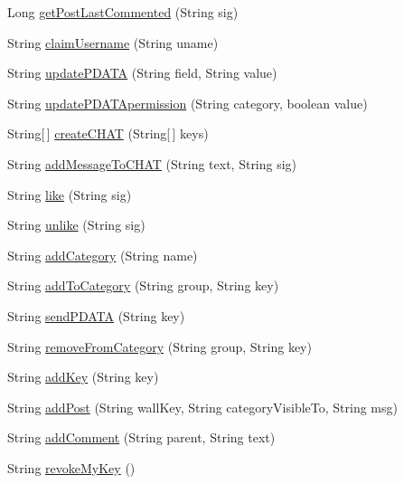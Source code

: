 \begin{DoxyCompactItemize}
Long \hyperlink{classballmerpeak_1_1turtlenet_1_1server_1_1TurtlenetImpl_ac98d21dc081755ae7ec66220a0287551}{get\-Post\-Last\-Commented} (String sig)
\item 
String \hyperlink{classballmerpeak_1_1turtlenet_1_1server_1_1TurtlenetImpl_a614a4363b79719b16cc10d9871807326}{claim\-Username} (String uname)
\item 
String \hyperlink{classballmerpeak_1_1turtlenet_1_1server_1_1TurtlenetImpl_a6498adb8c069a9778b241dde8bad667a}{update\-P\-D\-A\-T\-A} (String field, String value)
\item 
String \hyperlink{classballmerpeak_1_1turtlenet_1_1server_1_1TurtlenetImpl_af50db109b6ae5adde4ac18a324a4aa66}{update\-P\-D\-A\-T\-Apermission} (String category, boolean value)
\item 
String\mbox{[}$\,$\mbox{]} \hyperlink{classballmerpeak_1_1turtlenet_1_1server_1_1TurtlenetImpl_a9dc47df7e7847ac053c189f38b9c7b14}{create\-C\-H\-A\-T} (String\mbox{[}$\,$\mbox{]} keys)
\item 
String \hyperlink{classballmerpeak_1_1turtlenet_1_1server_1_1TurtlenetImpl_a89238dc6ef01ca846a4b616a1d510f85}{add\-Message\-To\-C\-H\-A\-T} (String text, String sig)
\item 
String \hyperlink{classballmerpeak_1_1turtlenet_1_1server_1_1TurtlenetImpl_ab806c36948df3c570656cd02025f5188}{like} (String sig)
\item 
String \hyperlink{classballmerpeak_1_1turtlenet_1_1server_1_1TurtlenetImpl_a34dd5b2e3422a38ddd9ab2ded072e870}{unlike} (String sig)
\item 
String \hyperlink{classballmerpeak_1_1turtlenet_1_1server_1_1TurtlenetImpl_abb2702210515c425be14f39584f761db}{add\-Category} (String name)
\item 
String \hyperlink{classballmerpeak_1_1turtlenet_1_1server_1_1TurtlenetImpl_af382d8d355b9a479d9c047fd9ae722ac}{add\-To\-Category} (String group, String key)
\item 
String \hyperlink{classballmerpeak_1_1turtlenet_1_1server_1_1TurtlenetImpl_a2436ebfe8ae7ed08b831f21f83aaf3bc}{send\-P\-D\-A\-T\-A} (String key)
\item 
String \hyperlink{classballmerpeak_1_1turtlenet_1_1server_1_1TurtlenetImpl_ae8181f4e329a9ffa1d1b4d5deebf617d}{remove\-From\-Category} (String group, String key)
\item 
String \hyperlink{classballmerpeak_1_1turtlenet_1_1server_1_1TurtlenetImpl_ac32167a339c28603b6166f7dc605f6b8}{add\-Key} (String key)
\item 
String \hyperlink{classballmerpeak_1_1turtlenet_1_1server_1_1TurtlenetImpl_ae66b52ba9debe2a2f06e6402d485526c}{add\-Post} (String wall\-Key, String category\-Visible\-To, String msg)
\item 
String \hyperlink{classballmerpeak_1_1turtlenet_1_1server_1_1TurtlenetImpl_a0a6b4c30111bf1c85613b2370c20f464}{add\-Comment} (String parent, String text)
\item 
String \hyperlink{classballmerpeak_1_1turtlenet_1_1server_1_1TurtlenetImpl_a2f380c86cd6789269b156b3a731834ae}{revoke\-My\-Key} ()
\end{DoxyCompactItemize}


